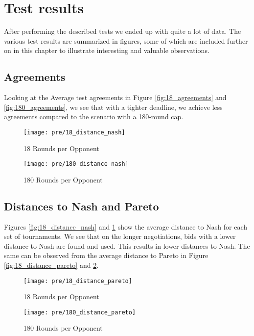 \section{Test results}

After performing the described tests we ended up with quite a lot of data. The various test results are summarized in figures, some of which are included further on in this chapter to illustrate interesting and valuable observations.

\subsection{Agreements}

Looking at the Average test agreements in Figure \ref{fig:18_agreements} and \ref{fig:180_agreements}, we see that with a tighter deadline, we achieve less agreements compared to the scenario with a 180-round cap.

\begin{figure}[H]
	\texttt{[image: pre/18\_distance\_nash]}
	\caption{18 Rounds per Opponent}
	\label{fig:18_distance_nash}
	\endminipage\hfill
	\texttt{[image: pre/180\_distance\_nash]}
	\caption{180 Rounds per Opponent}
	\label{fig:180_distance_nash}
	\endminipage\hfill
\end{figure}

\subsection{Distances to Nash and Pareto}

Figures \ref{fig:18_distance_nash} and \ref{fig:180_distance_nash} show the average distance to Nash for each set of tournaments. We see that on the longer negotiations, bids with a lower distance to Nash are found and used. This results in lower distances to Nash. The same can be observed from the average distance to Pareto in Figure \ref{fig:18_distance_pareto} and \ref{fig:180_distance_pareto}.

\begin{figure}[H]
	\texttt{[image: pre/18\_distance\_pareto]}
	\caption{18 Rounds per Opponent}
	\label{fig:18_distance_pareto}
	\endminipage\hfill
	\texttt{[image: pre/180\_distance\_pareto]}
	\caption{180 Rounds per Opponent}
	\label{fig:180_distance_pareto}
	\endminipage\hfill
\end{figure}


